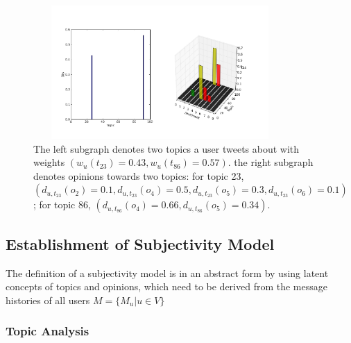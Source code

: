 \documentclass[letterpaper]{article}
\begin{document}
\begin{figure}[htb]
\includegraphics[width=3.8in,height=2.0in]{fig1.pdf}
\caption{The left subgraph denotes two topics a user tweets about with weights $ \left( w_{u}\left( t_{23} \right)=0.43, w_{u}\left( t_{86} \right)=0.57\right)  $. the right subgraph denotes opinions towards two topics: for topic 23, $ ( d_{u,t_{23}} \left( o_{2} \right)=0.1, d_{u,t_{23}} \left( o_{4} \right)=0.5,d_{u,t_{23}} \left( o_{5} \right)=0.3,d_{u,t_{23}} \left( o_{6} \right)=0.1) $; for topic 86, $ \left( d_{u,t_{86}} \left( o_{4} \right)=0.66, d_{u,t_{86}} \left( o_{5} \right)=0.34 \right) $.}
\label{fig0}
\end{figure}

\subsection{Establishment of Subjectivity Model}
\label{establishment}

The definition of a subjectivity model is in an abstract form by using latent concepts of topics and opinions,  which need to be derived from the message histories of all users $ M=\lbrace M_{u}\vert u \in V\rbrace$  

\subsubsection{Topic Analysis}
\label{topic}
\end{document}
